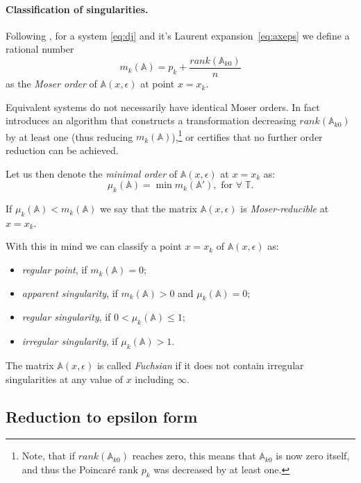 \documentclass{elsarticle}
\newcommand{\eps}{\epsilon}
\newcommand{\M}[1]{\mathbb{#1}} %
\begin{document}
\paragraph{Classification of singularities.}
Following \cite{Mos59}, for a system \eqref{eq:dj} and it's Laurent expansion~\eqref{eq:axeps} we define a rational number
\begin{equation}
\label{eq:mk}
    m_k(\M A) = p_k + \frac{rank(\M A_{k0})}{n}
\end{equation}
as the {\em Moser order} of $\M A(x,\eps)$ at point $x=x_k$.

Equivalent systems do not necessarily have identical Moser orders.
In fact \cite{Mos59} introduces an algorithm that constructs a transformation decreasing $rank(\M A_{k0})$ by at least one (thus reducing $m_k(\M A)$),\footnote{Note, that if $rank(\M A_{k0})$ reaches zero, this means that $\M A_{k0}$ is now zero itself, and thus the Poincar\'e rank $p_k$ was decreased by at least one.} or certifies that no further order reduction can be achieved.

Let us then denote the {\em minimal order} of $\M A(x,\eps)$ at $x=x_k$ as:
\begin{equation}
\label{eq:muk}
  \mu_k(\M A) = \min m_k(\M A'), \text{ for } \forall \; \M T.
\end{equation}

If $\mu_k(\M A) < m_k(\M A)$ we say that the matrix $\M A(x,\eps)$ is {\em Moser-reducible} at $x=x_k$.

With this in mind we can classify a point $x=x_k$ of $\M A(x,\eps)$ as:
\begin{itemize}
  \item {\em regular point}, if $m_k(\M A) = 0$;
  \item {\em apparent singularity}, if $m_k(\M A) > 0$ and $\mu_k(\M A) = 0$;
  \item {\em regular singularity}, if $0 < \mu_k(\M A) \le 1$;
  \item {\em irregular singularity}, if $\mu_k(\M A) > 1$.
\end{itemize}
The matrix $\M A(x,\eps)$ is called {\em Fuchsian} if it does not contain irregular singularities at any value of $x$ including $\infty$.


\subsection{Reduction to epsilon form}
\end{document}
